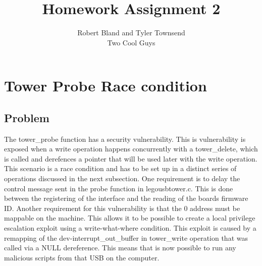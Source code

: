\documentclass{article}
\author{Robert Bland and Tyler Townsend\\ Two Cool Guys}
\title{Homework Assignment 2}
\begin{document}
\maketitle

\section{Tower Probe Race condition} 

\subsection{Problem}
The tower\_probe function has a security vulnerability. This is vulnerability is exposed when a write operation happens concurrently with a tower\_delete, which is called and derefences a pointer that will be used later with the write operation. This scenario is a race condition and has to be set up in a distinct series of operations discussed in the next subsection.  One requirement is to delay the control message sent in the probe function in legousbtower.c. This is done between the registering of the interface and the reading of the boards firmware ID. Another requirement for this vulnerability is that the 0 address must be mappable on the machine. This allows it to be possible to create a local privilege escalation exploit using a write-what-where condition. This exploit is caused by a remapping of the dev-interrupt\_out\_buffer in tower\_write operation that was called via a NULL dereference. This means that is now possible to run any malicious scripts from that USB on the computer. 
\end{document}
